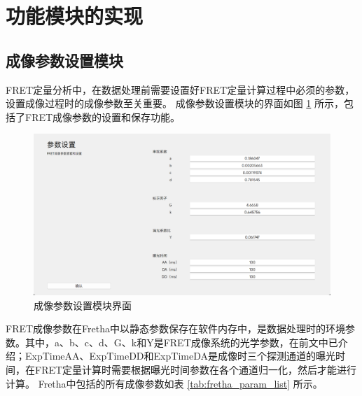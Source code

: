 \section{功能模块的实现}

\subsection{成像参数设置模块}
\ifshowtext
FRET定量分析中，在数据处理前需要设置好FRET定量计算过程中必须的参数，设置成像过程时的成像参数至关重要。
成像参数设置模块的界面如图 \ref{fig:fretha_param_module} 所示，包括了FRET成像参数的设置和保存功能。
\begin{figure}[hbtp]
  \centering
  \includegraphics[width=0.9\linewidth]{../figures/2/2_参数设置界面.png}
  \caption{成像参数设置模块界面}
  \label{fig:fretha_param_module}
\end{figure}

FRET成像参数在Fretha中以静态参数保存在软件内存中，是数据处理时的环境参数。其中，a、b、c、d、G、k和Y是FRET成像系统的光学参数，在前文中已介绍；ExpTimeAA、ExpTimeDD和ExpTimeDA是成像时三个探测通道的曝光时间，在FRET定量计算时需要根据曝光时间参数在各个通道归一化，然后才能进行计算。
Fretha中包括的所有成像参数如表 \ref{tab:fretha_param_list} 所示。

